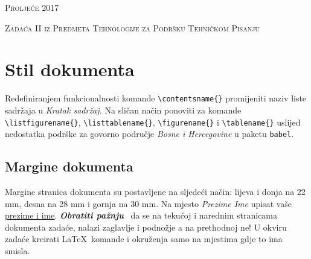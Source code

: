 \documentclass[letterpaper,10pt]{article}
\newcommand{\crveno}[1]
 {\textsl{\textbf{\color{boja1}#1\color{black}}}~}
\newcommand{\naredba}[1]
{\texttt{\color{boja1}\textbackslash{}#1\color{black}\{\}}}
\begin{document}
\noindent{} \hfill{}	\textsc{Proljeće 2017} \\ 
\vspace{6mm}
\begin{center}
\LARGE{}\textsc{Zadaća II iz Predmeta Tehnologije za Podršku
Tehničkom Pisanju}	
\vspace{6mm}

\renewcommand{\abstractname}{Abstract}
\begin{abstract}
\textbf{\textsl{U okviru zadaće II}} biti će demonstrirano svo stečeno znanje iz predmeta \textsl{Tehnologije za podršku tehničkom pisanju} vezano za \LaTeX. Studenti će \crveno{demonstrirati stečeno znanje}  na način da repliciraju sadržaj dokumenta (stranice od 1 do 6) pri čemu moraju obratiti pažnju na svaki detalj u originalnom dokumentu. Replicirani dokument mora biti \underline{vjerodostojna kopija} originalnom dokumentu (100\% kopija osim dijela prezime i ime, i broj indeksa). Kako rezultat, studenti će \textbf{\textsl{\color{blue}predati kod}} (*.tex file) prema pravilima definiranim na prethodnoj stranici teksta zadaće.
\end{abstract}
\end{center}

\renewcommand{\contentsname}{Kratak sadržaj}
\renewcommand{\listfigurename}{Kratka lista slika}
\renewcommand{\listtablename}{Kratka lista tabela}
\renewcommand{\figurename}{Sličica}
\renewcommand{\tablename}{Tabelica}
\tableofcontents
\listoffigures
\listoftables

\section{Stil dokumenta}
Redefiniranjem funkcionalnosti komande \naredba{contentsname} promijeniti naziv liste sadržaja u \textsl{Kratak sadržaj.} 
Na sličan način ponoviti za komande \naredba{listfigurename}, \naredba{listtablename}, \naredba{figurename} i \naredba{tablename} uslijed nedostatka podrške za govorno područje \textsl{Bosne i Hercegovine} u paketu \texttt{babel}.
\newpage
\pagestyle{logo_stil}
\subsection{Margine dokumenta}
Margine stranica dokumenta su postavljene na sljedeći način: lijeva i donja na 22 mm, desna na 28 mm i gornja na 30 mm. Na mjesto \textsl{Prezime Ime} upisat vaše \ul{prezime i ime}. \crveno{Obratiti pažnju} da se na tekućoj i narednim stranicama dokumenta zadaće, nalazi zaglavlje i podnožje a na prethodnoj ne! U okviru zadaće kreirati \LaTeX\ komande i okruženja samo na mjestima gdje to ima smisla.
\end{document}
